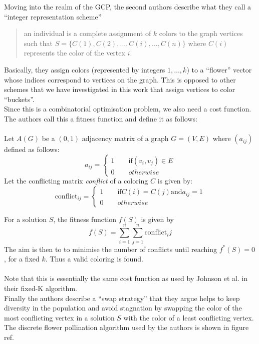 Moving into the realm of the GCP, the second authors describe what they call a ``integer representation scheme''
\begin{quotation}
an individual is a complete assignment of $k$ colors to the graph vertices such that $S = \{ C(1),C(2),\ldots,C(i),\ldots,C(n) \}$ where $C(i)$ represents the color of the vertex $i$.
\end{quotation}
Basically, they assign colors (represented by integers $1,\ldots,k$) to a ``flower'' vector whose indices correspond to vertices on the graph. This is opposed to other schemes that we have investigated in this work that assign vertices to color ``buckets''.\\
Since this is a combinatorial optimisation problem, we also need a cost function. The authors call this a fitness function and define it as follows:\\~\\
Let $A(G)$ be a $(0,1)$ adjacency matrix of a graph $G = (V,E)$ where $(a_{ij})$ defined as follows:
\begin{equation}
a_{ij} = \begin{cases}
1 \qquad \text{if} (v_i,v_j) \in E\\
0 \qquad otherwise
\end{cases}
\end{equation}
Let the conflicting matrix \emph{conflict} of a coloring $C$ is given by:
\begin{equation}
\text{conflict}_{ij} = \begin{cases}
1 \qquad \text{if} C(i)=C(j) \text{and} a_{ij}=1\\
0 \qquad otherwise
\end{cases}
\end{equation}

For a solution $S$, the fitness function $f(S)$ is given by
\begin{equation}
f(S) = \displaystyle \sum_{i=1}^{n} \sum_{j=1}^{n} \text{conflict}_ij
\end{equation}
The aim is then to to minimise the number of conflicts until reaching $f^*(S) = 0$, for a fixed $k$. Thus a valid coloring is found.\\~\\

Note that this is essentially the same cost function as used by Johnson et al. in their fixed-K algorithm.\\
Finally the authors describe a ``swap strategy'' that they argue helps to keep diversity in the population and avoid stagnation by swapping the color of the most conflicting vertex in a solution $S$ with the color of a least conflicting vertex.\\
The discrete flower pollination algorithm used by the authors is shown in figure ref{}.



